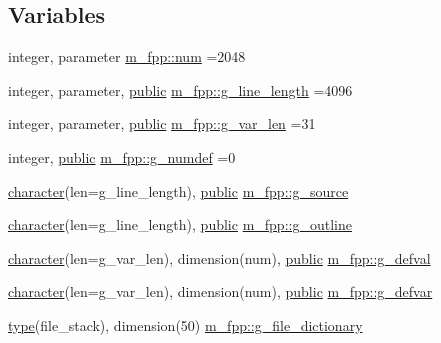 \subsection*{Variables}
\begin{DoxyCompactItemize}
\item 
integer, parameter \hyperlink{namespacem__fpp_adaa4b6694f65973ef728ad2189a8e6f2}{m\+\_\+fpp\+::num} =2048
\item 
integer, parameter, \hyperlink{M__stopwatch_83_8txt_a2f74811300c361e53b430611a7d1769f}{public} \hyperlink{namespacem__fpp_ab93f8756cf248cf8db932573009d4664}{m\+\_\+fpp\+::g\+\_\+line\+\_\+length} =4096
\item 
integer, parameter, \hyperlink{M__stopwatch_83_8txt_a2f74811300c361e53b430611a7d1769f}{public} \hyperlink{namespacem__fpp_a99c57ea4a304975a7afafcf0b292db06}{m\+\_\+fpp\+::g\+\_\+var\+\_\+len} =31
\item 
integer, \hyperlink{M__stopwatch_83_8txt_a2f74811300c361e53b430611a7d1769f}{public} \hyperlink{namespacem__fpp_a59fae4b75a68fde011c594b60e4b92a5}{m\+\_\+fpp\+::g\+\_\+numdef} =0
\item 
\hyperlink{option__stopwatch_83_8txt_abd4b21fbbd175834027b5224bfe97e66}{character}(len=g\+\_\+line\+\_\+length), \hyperlink{M__stopwatch_83_8txt_a2f74811300c361e53b430611a7d1769f}{public} \hyperlink{namespacem__fpp_a6e0e464a1765a84236cdda423119523b}{m\+\_\+fpp\+::g\+\_\+source}
\item 
\hyperlink{option__stopwatch_83_8txt_abd4b21fbbd175834027b5224bfe97e66}{character}(len=g\+\_\+line\+\_\+length), \hyperlink{M__stopwatch_83_8txt_a2f74811300c361e53b430611a7d1769f}{public} \hyperlink{namespacem__fpp_a7d195a44ce2fda4dc4f152fd174f0a86}{m\+\_\+fpp\+::g\+\_\+outline}
\item 
\hyperlink{option__stopwatch_83_8txt_abd4b21fbbd175834027b5224bfe97e66}{character}(len=g\+\_\+var\+\_\+len), dimension(num), \hyperlink{M__stopwatch_83_8txt_a2f74811300c361e53b430611a7d1769f}{public} \hyperlink{namespacem__fpp_a1a99b8d1526c19ed196bc1c1ba53ba4c}{m\+\_\+fpp\+::g\+\_\+defval}
\item 
\hyperlink{option__stopwatch_83_8txt_abd4b21fbbd175834027b5224bfe97e66}{character}(len=g\+\_\+var\+\_\+len), dimension(num), \hyperlink{M__stopwatch_83_8txt_a2f74811300c361e53b430611a7d1769f}{public} \hyperlink{namespacem__fpp_a07ee856eed5841b997794fe7c37bfed6}{m\+\_\+fpp\+::g\+\_\+defvar}
\item 
\hyperlink{stop__watch_83_8txt_a70f0ead91c32e25323c03265aa302c1c}{type}(file\+\_\+stack), dimension(50) \hyperlink{namespacem__fpp_a4d652f22f13a938d8b879d2da436e3e7}{m\+\_\+fpp\+::g\+\_\+file\+\_\+dictionary}

\end{DoxyCompactItemize}
